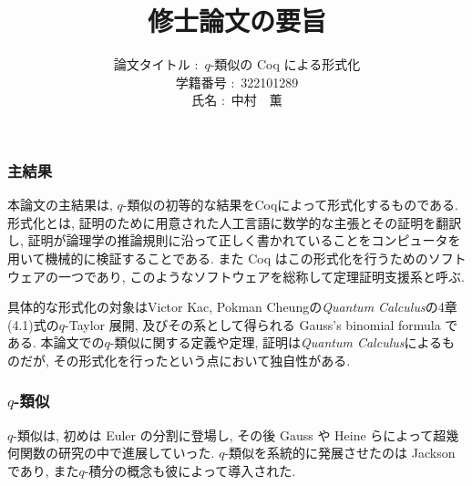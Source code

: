 \documentclass[11pt]{jsarticle}
\theoremstyle{mystyle}
\newcommand{\0}{\textbf{0}}
\begin{document}
\title{修士論文の要旨}
\author{論文タイトル $\colon$ $q$-類似の Coq による形式化\\
           学籍番号 $\colon$ 322101289\\
           氏名 $\colon$ 中村　薫}
\maketitle
\subsubsection*{主結果}
本論文の主結果は, $q$-類似の初等的な結果をCoqによって形式化するものである. 
形式化とは, 証明のために用意された人工言語に数学的な主張とその証明を翻訳し, 証明が論理学の推論規則に沿って正しく書かれていることをコンピュータを用いて機械的に検証することである.   また Coq はこの形式化を行うためのソフトウェアの一つであり, このようなソフトウェアを総称して定理証明支援系と呼ぶ.

具体的な形式化の対象はVictor Kac, Pokman Cheungの{\it Quantum Calculus}の4章(4.1)式の$q$-Taylor 展開, 及びその系として得られる Gauss's binomial formula である. 
本論文での$q$-類似に関する定義や定理, 証明は{\it Quantum Calculus}によるものだが, その形式化を行ったという点において独自性がある. 
\subsubsection*{$q$-類似}
$q$-類似は, 初めは Euler の分割に登場し, その後 Gauss や Heine らによって超幾何関数の研究の中で進展していった. $q$-類似を系統的に発展させたのは Jackson であり, また$q$-積分の概念も彼によって導入された. 
\end{document}
